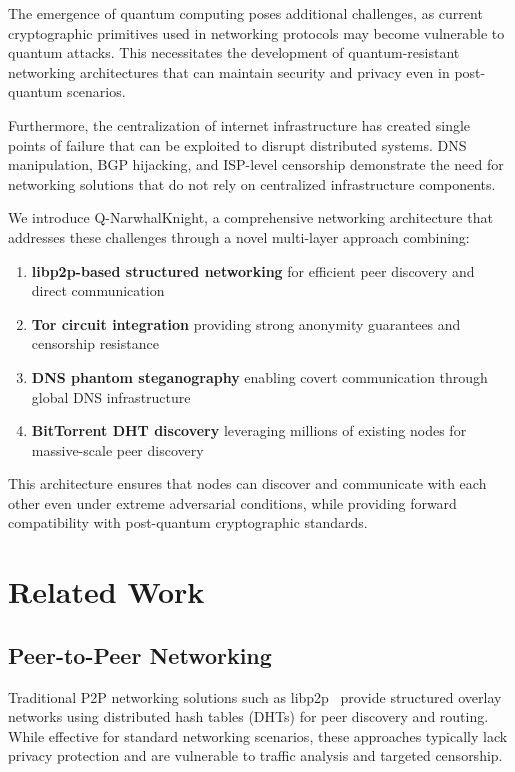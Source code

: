 \documentclass[11pt,a4paper]{article}
\theoremstyle{definition}
\theoremstyle{remark}
\begin{document}
The emergence of quantum computing poses additional challenges, as current cryptographic primitives used in networking protocols may become vulnerable to quantum attacks. This necessitates the development of quantum-resistant networking architectures that can maintain security and privacy even in post-quantum scenarios.

Furthermore, the centralization of internet infrastructure has created single points of failure that can be exploited to disrupt distributed systems. DNS manipulation, BGP hijacking, and ISP-level censorship demonstrate the need for networking solutions that do not rely on centralized infrastructure components.

We introduce Q-NarwhalKnight, a comprehensive networking architecture that addresses these challenges through a novel multi-layer approach combining:

\begin{enumerate}
    \item \textbf{libp2p-based structured networking} for efficient peer discovery and direct communication
    \item \textbf{Tor circuit integration} providing strong anonymity guarantees and censorship resistance
    \item \textbf{DNS phantom steganography} enabling covert communication through global DNS infrastructure
    \item \textbf{BitTorrent DHT discovery} leveraging millions of existing nodes for massive-scale peer discovery
\end{enumerate}

This architecture ensures that nodes can discover and communicate with each other even under extreme adversarial conditions, while providing forward compatibility with post-quantum cryptographic standards.

\section{Related Work}

\subsection{Peer-to-Peer Networking}

Traditional P2P networking solutions such as libp2p~\cite{libp2p} provide structured overlay networks using distributed hash tables (DHTs) for peer discovery and routing. While effective for standard networking scenarios, these approaches typically lack privacy protection and are vulnerable to traffic analysis and targeted censorship.
\end{document}
